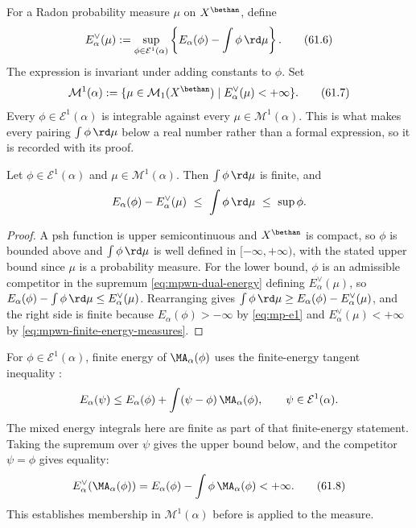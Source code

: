 For a Radon probability measure $\mu$ on $X^{\bethan}$, define
\[
 E_\alpha^\vee(\mu)
 :=\sup_{\phi\in\mathcal E^1(\alpha)}
       \left\{E_\alpha(\phi)-\int\phi\,\rd \mu\right\}.
\tag{61.6}\label{eq:mpwn-dual-energy}
\]
The expression is invariant under adding constants to $\phi$.  Set
\[
 \mathcal M^1(\alpha)
 :=\{\mu\in\mathcal M_1(X^{\bethan})\mid
                      E_\alpha^\vee(\mu)<+\infty\}.
\tag{61.7}\label{eq:mpwn-finite-energy-measures}
\]
Every $\phi\in\mathcal E^1(\alpha)$ is integrable against every
$\mu\in\mathcal M^1(\alpha)$.  This is what makes every pairing
$\int\phi\,\rd\mu$ below a real number rather than a formal expression,
so it is recorded with its proof.

\begin{lemma}
\label{lem:mpwn-integrability}
Let $\phi\in\mathcal E^1(\alpha)$ and $\mu\in\mathcal M^1(\alpha)$.
Then $\int\phi\,\rd\mu$ is finite, and
\[
 E_\alpha(\phi)-E_\alpha^\vee(\mu)\ \leq\ \int\phi\,\rd\mu\ \leq\ \sup\phi .
\]
\end{lemma}

\begin{proof}
A psh function is upper semicontinuous and $X^{\bethan}$ is compact, so
$\phi$ is bounded above and $\int\phi\,\rd\mu$ is well defined in
$[-\infty,+\infty)$, with the stated upper bound since $\mu$ is a
probability measure.  For the lower bound, $\phi$ is an admissible
competitor in the supremum \eqref{eq:mpwn-dual-energy} defining
$E_\alpha^\vee(\mu)$, so
$E_\alpha(\phi)-\int\phi\,\rd\mu\leq E_\alpha^\vee(\mu)$.  Rearranging
gives $\int\phi\,\rd\mu\geq E_\alpha(\phi)-E_\alpha^\vee(\mu)$, and the
right side is finite because $E_\alpha(\phi)>-\infty$ by
\eqref{eq:mp-e1} and $E_\alpha^\vee(\mu)<+\infty$ by
\eqref{eq:mpwn-finite-energy-measures}.
\end{proof}

For $\phi\in\mathcal E^1(\alpha)$, finite energy of
$\MA_\alpha(\phi)$ uses the finite-energy tangent inequality
\cite[Proposition~2.3.5 and its proof]{MPWN25}:
\[
 E_\alpha(\psi)
       \leq E_\alpha(\phi)
               +\int(\psi-\phi)\,\MA_\alpha(\phi),
       \qquad \psi\in\mathcal E^1(\alpha).
\]
The mixed energy integrals here are finite as part of that
finite-energy statement.  Taking the supremum over $\psi$
gives the upper bound below, and the competitor $\psi=\phi$
gives equality:
\[
 E_\alpha^\vee(\MA_\alpha(\phi))
 =E_\alpha(\phi)-\int\phi\,\MA_\alpha(\phi)<+\infty.
\tag{61.8}\label{eq:mpwn-dual-energy-ma}
\]
This establishes membership in $\mathcal M^1(\alpha)$ before
 is applied to the measure.

